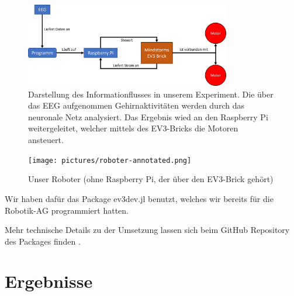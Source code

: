 \documentclass[11pt]{scrartcl}
\begin{document}
	\begin{figure}[H]
		\centering
		\includegraphics[width=0.8\textwidth]{pictures/roboter-funktionsweise.png}
		\caption{Darstellung des Informationflusses in unserem Experiment. Die über das EEG aufgenommen Gehirnaktivitäten werden durch das neuronale Netz analysiert. Das Ergebnis wied an den Raspberry Pi weitergeleitet, welcher mittels des EV3-Bricks die Motoren ansteuert.}
		\label{robot-funktion}
	\end{figure}

	\begin{figure}[H]
		\centering
		\texttt{[image: pictures/roboter-annotated.png]}
		\caption{Unser Roboter (ohne Raspberry Pi, der über den EV3-Brick gehört)}
		\label{Robot}
	\end{figure}

	Wir haben dafür das Package ev3dev.jl benutzt, welches wir bereits für die Robotik-AG programmiert hatten.
	
	Mehr technische Details zu der Umsetzung lassen sich beim GitHub Repository des Packages finden \cite{ev3dev}.
	



	\section{Ergebnisse}
\end{document}
